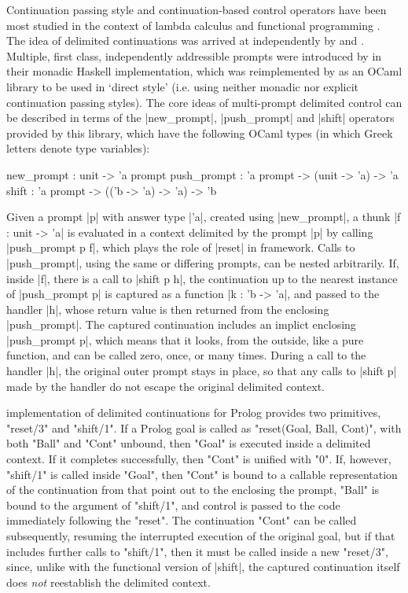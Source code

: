 Continuation passing style and continuation-based control operators have been most studied in the
context of lambda calculus and functional programming \citep{SussmanSteele1975}.
The idea of delimited continuations was arrived at independently by \cite{Felleisen1988} and
\cite{DanvyFilinski1990}. Multiple, first class, independently addressible prompts were introduced
by \cite{DyvbigJonesSabry2005} in their monadic Haskell implementation, which was reimplemented
by \cite{Kiselyov2012} as an OCaml library to be used in `direct style'
(i.e. using neither monadic nor explicit continuation passing styles). The core ideas of multi-prompt delimited
control can be described in terms of the |new_prompt|, |push_prompt| and |shift| operators provided by
this library, which have the following OCaml types (in which Greek letters denote type variables):
\begin{ocamlet}
	new_prompt	: unit -> 'a prompt
	push_prompt	: 'a prompt -> (unit -> 'a) -> 'a
	shift        : 'a prompt -> (('b -> 'a) -> 'a) -> 'b
\end{ocamlet}
Given a prompt |p| with answer type |'a|, created using |new_prompt|, a thunk |f : unit -> 'a| is evaluated
in a context delimited by the prompt |p| by calling |push_prompt p f|, which plays the role of |reset| in 
 framework.
Calls to |push_prompt|, using the same or differing prompts, can be nested arbitrarily.
If, inside |f|, there is a call to |shift p h|, the
continuation up to the nearest instance of |push_prompt p| is captured as a function |k : 'b -> 'a|, and passed to the handler
|h|, whose return value is then returned from the enclosing |push_prompt|. The captured continuation includes an implict
enclosing |push_prompt p|, which means that it looks, from the outside,
like a pure function, and can be called zero, once, or many times. During a call to the handler |h|,
the original outer prompt stays in place, so that any calls to |shift p| made by the handler do not
escape the original delimited context.

 implementation of delimited continuations for Prolog provides two
primitives, "reset/3" and "shift/1". If a Prolog goal is called as "reset(Goal, Ball, Cont)", with both
"Ball" and "Cont" unbound, then "Goal" is executed inside a delimited context. If it completes
successfully, then "Cont" is unified with "0".  If, however, "shift/1" is called inside "Goal", then "Cont" is bound
to a callable representation of the continuation from that point out to the enclosing the prompt, "Ball"
is bound to the argument of "shift/1", and control is passed to the code immediately following the "reset".
The continuation "Cont" can be called subsequently, resuming the interrupted execution of the original
goal, but if that includes further calls to "shift/1", then it must be called inside a new
"reset/3", since, unlike with the functional version of |shift|, the captured continuation itself
does \emph{not} reestablish the delimited context.

